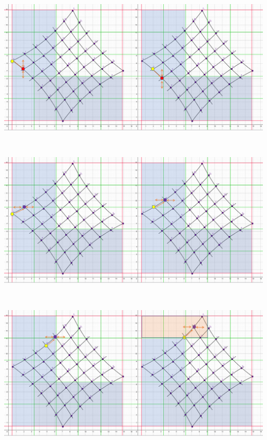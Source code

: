 \begin{minipage}{\linewidth}
	\centering
	\includegraphics[width=1\linewidth]{images/VerzeichnetesSchachbrett_4.png}
\end{minipage}\\

\begin{minipage}{\linewidth}
	\centering
	\includegraphics[width=1\linewidth]{images/VerzeichnetesSchachbrett_5.png}
\end{minipage}\\

\begin{minipage}{\linewidth}
	\centering
	\includegraphics[width=1\linewidth]{images/VerzeichnetesSchachbrett_6.png}
\end{minipage}\\


